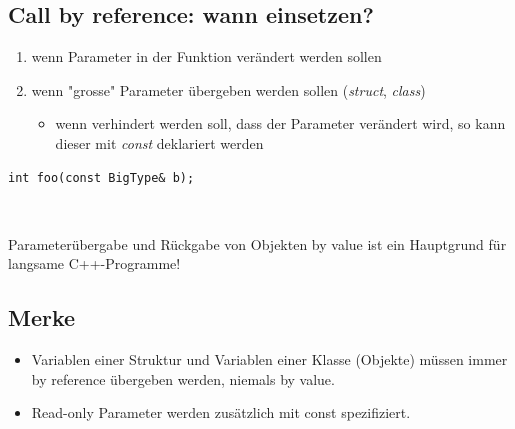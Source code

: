\subsection{Call by reference: wann einsetzen?}
\begin{enumerate}
	\item wenn Parameter in der Funktion verändert werden sollen
	\item wenn "grosse" Parameter übergeben werden sollen (\emph{struct}, \emph{class})
	\begin{itemize}
		\item[\-] wenn verhindert werden soll, dass der Parameter verändert wird, so kann dieser mit \emph{const} deklariert werden
	\end{itemize}
\end{enumerate}
\begin{minipage}{0.35\linewidth}
\begin{lstlisting}
int foo(const BigType& b);
\end{lstlisting}
\end{minipage}\\
\begin{achtung}
Parameterübergabe und Rückgabe von Objekten by value ist ein Hauptgrund für langsame C++-Programme!
\end{achtung}

\subsection{Merke}
\begin{itemize}
\item Variablen einer Struktur und Variablen einer Klasse (Objekte) müssen immer by reference übergeben werden, niemals by value.
\item Read-only Parameter werden zusätzlich mit const spezifiziert.
\end{itemize}